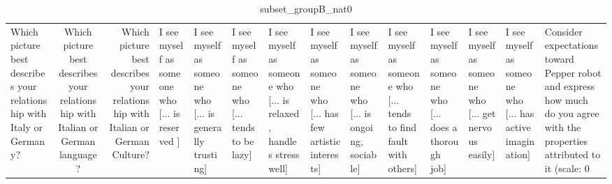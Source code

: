\begin{table}
\caption{subset_groupB_nat0}
\label{tab:subset_groupB_nat0}
\begin{tabular}{lcr}
\toprule
Which picture best describes your relationship with Italy or Germany? & Which picture best describes your relationship with Italian or German language? & Which picture best describes your relationship with Italian or German Culture? & I see myself as someone who  [... is reserved ] & I see myself as someone who  [... is generally trusting] & I see myself as someone who  [... tends to be lazy] & I see myself as someone who  [... is relaxed, handles stress well] & I see myself as someone who  [... has few artistic interests] & I see myself as someone who  [... is ongoing, sociable] & I see myself as someone who  [... tends to find fault with others] & I see myself as someone who  [... does a thorough job] & I see myself as someone who  [... get nervous easily] & I see myself as someone who  [... has active imagination] & Consider expectations toward Pepper robot and express how much do you agree with the properties attributed to it (scale: 0%
\end{tabular}
\end{table}
